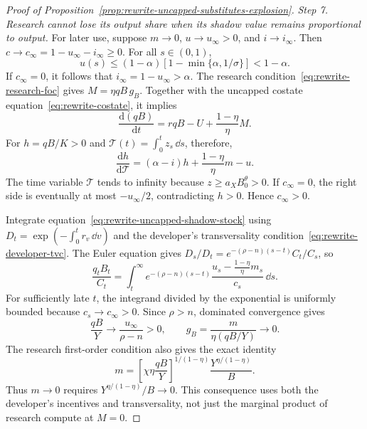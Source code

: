 \begin{proof}[Proof of Proposition~\ref{prop:rewrite-uncapped-substitutes-explosion}]
\textit{Step 7. Research cannot lose its output share when its shadow value remains proportional to output.}
For later use, suppose $m\to0$, $u\to u_\infty>0$, and $i\to i_\infty$.
Then $c\to c_\infty=1-u_\infty-i_\infty\geq0$.
For all $s\in(0,1)$,
\[
 u(s)\leq(1-\alpha)[1-\min\{\alpha,1/\sigma\}]<1-\alpha.
\]
If $c_\infty=0$, it follows that $i_\infty=1-u_\infty>\alpha$.
The research condition~\eqref{eq:rewrite-research-foc} gives
$M=\eta qB\,g_B$. Together with the uncapped costate
equation~\eqref{eq:rewrite-costate}, it implies
\begin{equation}
 \frac{\mathrm d(qB)}{\mathrm dt}
 =rqB-U+\frac{1-\eta}{\eta}M.
 \label{eq:rewrite-uncapped-shadow-stock}
\end{equation}
For $h=qB/K>0$ and $\mathcal T(t)=\int_0^t z_s\,\dd s$, therefore,
\begin{equation}
 \frac{\mathrm dh}{\mathrm d\mathcal T}
 =(\alpha-i)h+\frac{1-\eta}{\eta}m-u.
 \label{eq:rewrite-uncapped-shadow-capital}
\end{equation}
The time variable $\mathcal T$ tends to infinity because
$z\geq a_XB_0^\theta>0$. If $c_\infty=0$, the right side is eventually
at most $-u_\infty/2$, contradicting $h>0$. Hence $c_\infty>0$.

Integrate equation~\eqref{eq:rewrite-uncapped-shadow-stock} using
$D_t=\exp(-\int_0^t r_v\,\dd v)$ and the developer's transversality
condition~\eqref{eq:rewrite-developer-tvc}. The Euler equation gives
$D_s/D_t=e^{-(\rho-n)(s-t)}C_t/C_s$, so
\begin{equation}
 \frac{q_tB_t}{C_t}=
 \int_t^\infty e^{-(\rho-n)(s-t)}
 \frac{u_s-\frac{1-\eta}{\eta}m_s}{c_s}\,\dd s.
 \label{eq:rewrite-uncapped-shadow-pv}
\end{equation}
For sufficiently late $t$, the integrand divided by the exponential
is uniformly bounded because $c_s\to c_\infty>0$.
Since $\rho>n$, dominated convergence gives
\begin{equation}
 \frac{qB}{Y}\longrightarrow\frac{u_\infty}{\rho-n}>0,
 \qquad
 g_B=\frac{m}{\eta(qB/Y)}\longrightarrow0.
 \label{eq:rewrite-uncapped-vanishing-research-value}
\end{equation}
The research first-order condition also gives the exact identity
\begin{equation}
 m=\left[\chi\eta\frac{qB}{Y}\right]^{1/(1-\eta)}
       \frac{Y^{\eta/(1-\eta)}}{B}.
 \label{eq:rewrite-uncapped-research-output-scale}
\end{equation}
Thus $m\to0$ requires $Y^{\eta/(1-\eta)}/B\to0$. This consequence uses
both the developer's incentives and transversality, not just the marginal
product of research compute at $M=0$.


\end{proof}
